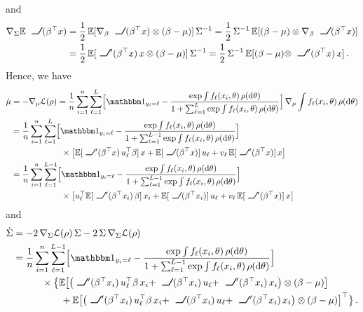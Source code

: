 \documentclass{custom}
\begin{document}
and
\begin{align*}
\nabla_{\Sigma}\mathbb{E}\ReLU(\beta^\top x )
& =\frac{1}{2}\,\mathbb{E}[\nabla_{\beta} \ReLU(\beta^\top x ) \otimes(\beta-\mu)]\,\Sigma^{-1}=\frac{1}{2}\,\Sigma^{-1}\,\mathbb{E}[(\beta-\mu)\otimes\nabla_{\beta}\ReLU(\beta^\top x )]\\
 & =\frac{1}{2}\,\mathbb{E}[\ReLU'(\beta^\top x )\,x\otimes(\beta-\mu)]\,\Sigma^{-1}=\frac{1}{2}\,\Sigma^{-1}\,\mathbb{E}[(\beta-\mu)\otimes\ReLU'(\beta^\top x )\,x]\,.
\end{align*}
Hence, we have
\begin{align*}
\dot{\mu} & =-\nabla_{\mu}\loss(\rho)
=\frac{1}{n}\sum_{i=1}^{n}\sum_{\ell=1}^{L}\Bigl[\ind_{y_{i}=\ell}-\frac{\exp\int f_{\ell}(x_{i},\theta)\,\rho(\D\theta)}{1+\sum_{\ell=1}^{L}\exp\int f_{\ell}(x_{i},\theta)\,\rho(\D\theta)}\Bigr]\,\nabla_{\mu}\int f_{\ell}(x_{i},\theta)\,\rho(\D\theta)\\
 & =\frac{1}{n}\sum_{i=1}^{n}\sum_{\ell=1}^{L}\Bigl[\ind_{y_{i}=\ell}-\frac{\exp\int f_{\ell}(x_{i},\theta)\,\rho(\D\theta)}{1+\sum_{\ell=1}^{L-1}\exp\int f_{\ell}(x_{i},\theta)\,\rho(\D\theta)}\Bigr] \\
 &\qquad\qquad\qquad{}\times \bigl[\mathbb{E}[\ReLU'(\beta^\top x ) \,u_{\ell}^{\top}\beta]\,x+\mathbb{E}[\ReLU(\beta^\top x )]\,u_{\ell}+v_{\ell}\,\mathbb{E}[\ReLU'(\beta^\top x )]\,x\bigr]\\
 & =\frac{1}{n}\sum_{i=1}^{n}\sum_{\ell=1}^{L-1}\Bigl[\ind_{y_{i}=\ell}-\frac{\exp\int f_{\ell}(x_{i},\theta)\,\rho(\D\theta)}{1+\sum_{\ell=1}^{L-1}\exp\int f_{\ell}(x_{i},\theta)\,\rho(\D\theta)}\Bigr] \\
 &\qquad\qquad\qquad{}\times \bigl[u_{\ell}^{\top}\mathbb{E}[\ReLU'(\beta^\top x_i)\,\beta]\,x_{i}+\mathbb{E}[\ReLU(\beta^\top x_i)]\,u_{\ell}+v_{\ell}\,\mathbb{E}[\ReLU'(\beta^\top x )]\,x\bigr]
\end{align*}
and
\begin{align*}
\dot{\Sigma}
& = -2\,\nabla_{\Sigma}\loss(\rho)\,\Sigma-2\,\Sigma\,\nabla_{\Sigma}\loss(\rho)\\
 & =\frac{1}{n}\sum_{i=1}^{n}\sum_{\ell=1}^{L-1}\Bigl[\ind_{y_{i}=\ell}-\frac{\exp\int f_{\ell}(x_{i},\theta)\,\rho(\D\theta)}{1+\sum_{\ell=1}^{L-1}\exp\int f_{\ell}(x_{i},\theta)\,\rho(\D\theta)}\Bigr]\\
 &\qquad\quad {}\times \bigl\{\mathbb{E}\bigl[\bigl(\ReLU'(\beta^\top x_i)\,u_{\ell}^{\top}\beta\,x_{i}+\ReLU(\beta^\top x_i)\,u_{\ell}+\ReLU'(\beta^\top x_i)\,x_{i}\bigr)\otimes(\beta-\mu)\bigr] \\
 &\qquad\qquad\quad+\mathbb{E}\bigl[\bigl(\ReLU'(\beta^\top x_i)\,u_{\ell}^{\top}\beta\,x_{i}+\ReLU(\beta^\top x_i)\,u_{\ell}+\ReLU'(\beta^\top x_i)\,x_{i}\bigr)\otimes(\beta-\mu)\bigr]^\top\bigr\}\,.
\end{align*}
\end{document}
